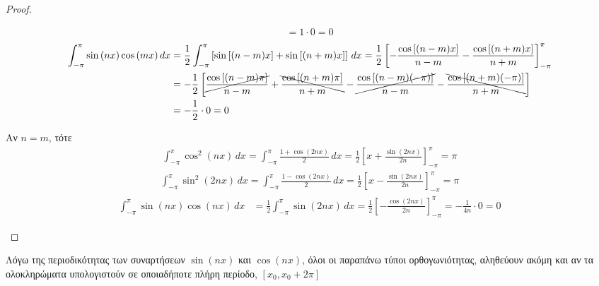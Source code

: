 \documentclass[a4paper,table]{report}
\begin{document}
\begin{proof}
\begin{myitemize}
\begin{align*}
              = 1 \cdot 0 = 0  
      \end{align*}
      \begin{align*}
        \int _{-\pi}^{\pi} \sin{(nx)} \cos{(mx)} \,{dx} 
            &= \frac{1}{2} \int _{-\pi}^{\pi} \left[\sin{[(n-m)x]} + 
              \sin{[(n+m)x]} \right] \,{dx} 
              = \frac{1}{2} \left[-\frac{\cos{[(n-m)x]}}{n-m} - 
              \frac{\cos{[(n+m)x]}}{n+m} \right]_{-\pi}^{\pi} \\
            &=  - \frac{1}{2} \left[\cancel{\frac{\cos{[(n-m) \pi]}}{n-m}} + 
              \bcancel{\frac{\cos{[(n+m) \pi]}}{n+m}} - \cancel{\frac{\cos{[(n-m)
            (-\pi)]}}{n-m}} - \bcancel{\frac{\cos{[(n+m) (-\pi)]}}{n+m}} \right] \\
            &= - \frac{1}{2} \cdot 0 = 0  
      \end{align*}
    \item Αν $ n = m $, τότε
      \begin{align*}
        \int _{-\pi}^{\pi} \cos^{2}(nx) \,{dx} = 
        \int _{-\pi}^{\pi} \frac{1+ \cos{(2nx)}}{2}
        \,{dx} = 
        \frac{1}{2} \left[x + \frac{\sin{(2nx)}}{2n} \right]_{-\pi}^{\pi} = \pi
      \end{align*}
      \begin{align*}
        \int _{-\pi}^{\pi} \sin^{2}(2nx) \,{dx} = 
        \int _{-\pi}^{\pi} \frac{1- \cos{(2nx)}}{2}
        \,{dx} = 
        \frac{1}{2} \left[x - \frac{\sin{(2nx)}}{2n} \right]_{-\pi}^{\pi} = \pi
      \end{align*}
      \begin{align*}
        \int _{-\pi}^{\pi} \sin{(nx)} \cos{(nx)} \,{dx} 
            &= \frac{1}{2} \int _{-\pi}^{\pi} \sin{(2nx)} \,{dx} 
            = \frac{1}{2} \left[-\frac{\cos{(2nx)}}{2n}\right] _{-\pi}^{\pi} 
            =  - \frac{1}{4n} \cdot 0 = 0  
      \end{align*}
  \end{myitemize}
\end{proof} 

\begin{rem}
  Λόγω της περιοδικότητας των συναρτήσεων $ \sin{(nx)} $ και $ \cos{(nx)} $, όλοι οι
  παραπάνω τύποι ορθογωνιότητας, αληθεύουν ακόμη και αν τα ολοκληρώματα υπολογιστούν 
  σε οποιαδήποτε πλήρη περίοδο, $ [x_{0}, x_{0}+ 2 \pi] $  
\end{rem}
\end{document}

